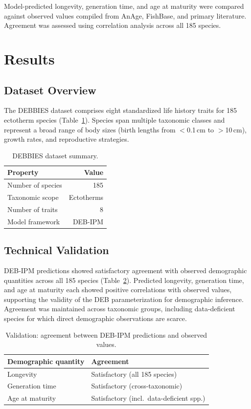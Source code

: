 \documentclass[11pt]{article}
\begin{document}
Model-predicted longevity, generation time, and age at maturity were compared against observed values compiled from AnAge, FishBase, and primary literature. Agreement was assessed using correlation analysis across all 185 species.

\section{Results}

\subsection{Dataset Overview}

The DEBBIES dataset comprises eight standardized life history traits for 185 ectotherm species (Table~\ref{tab:overview}). Species span multiple taxonomic classes and represent a broad range of body sizes (birth lengths from $<$0.1\,cm to $>$10\,cm), growth rates, and reproductive strategies.

\begin{table}[h]
\centering
\caption{DEBBIES dataset summary.}
\label{tab:overview}
\begin{tabular}{lr}
\toprule
Property & Value \\
\midrule
Number of species & 185 \\
Taxonomic scope & Ectotherms \\
Number of traits & 8 \\
Model framework & DEB-IPM \\
\bottomrule
\end{tabular}
\end{table}

\subsection{Technical Validation}

DEB-IPM predictions showed satisfactory agreement with observed demographic quantities across all 185 species (Table~\ref{tab:validation}). Predicted longevity, generation time, and age at maturity each showed positive correlations with observed values, supporting the validity of the DEB parameterization for demographic inference. Agreement was maintained across taxonomic groups, including data-deficient species for which direct demographic observations are scarce.

\begin{table}[h]
\centering
\caption{Validation: agreement between DEB-IPM predictions and observed values.}
\label{tab:validation}
\begin{tabular}{ll}
\toprule
Demographic quantity & Agreement \\
\midrule
Longevity & Satisfactory (all 185 species) \\
Generation time & Satisfactory (cross-taxonomic) \\
Age at maturity & Satisfactory (incl.\ data-deficient spp.) \\
\bottomrule
\end{tabular}
\end{table}
\end{document}

